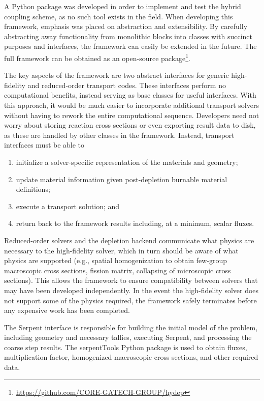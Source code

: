 \documentclass[letterpaper]{mc2021}
\begin{document}
A Python package was developed in order to implement and test the hybrid coupling
scheme, as no such tool exists in the field.
When developing this framework, emphasis was placed on abstraction and extensibility.
By carefully abstracting away functionality from monolithic blocks into classes with
succinct purposes and interfaces, the framework can easily be extended in the future.
The full framework can be obtained as an open-source package\footnote{%
    \url{https://github.com/CORE-GATECH-GROUP/hydep}}.

The key aspects of the framework are two abstract interfaces for generic
high-fidelity and reduced-order transport codes.
These interfaces perform no computational benefits, instead serving
as base classes for useful interfaces.
With this approach, it would be much easier to incorporate additional transport
solvers without having to rework the entire computational sequence.
Developers need not worry about storing reaction cross sections or even exporting
result data to disk, as these are handled by other classes in the framework.
Instead, transport interfaces must be able to
\begin{enumerate}
    \item{initialize a solver-specific representation of the materials and geometry;}
    \item{update material information given post-depletion burnable material definitions;}
    \item{execute a transport solution; and}
    \item{return back to the framework results including, at a minimum, scalar fluxes.}
\end{enumerate}

Reduced-order solvers and the depletion backend communicate what physics are necessary
to the high-fidelity solver, which in turn should be aware of what physics are supported
(e.g., spatial homogenization to obtain few-group macroscopic cross sections, fission matrix,
collapsing of microscopic cross sections).
This allows the framework to ensure compatibility between solvers that may have been developed independently.
In the event the high-fidelity solver does not support some of the physics required,
the framework safely terminates before any expensive work has been completed.

The Serpent interface is responsible for building the initial model of the problem,
including geometry and necessary tallies, executing Serpent, and processing
the coarse step results.
The serpentTools Python package \cite{Johnson2020SerpenttoolsPythonPackage} is used
to obtain fluxes, multiplication factor, homogenized macroscopic cross sections,
and other required data.
\end{document}
